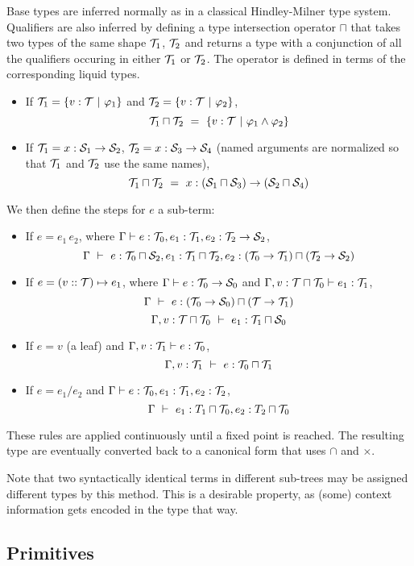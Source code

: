 Base types are inferred normally as in a classical Hindley-Milner type system.
Qualifiers are also inferred by defining a type intersection operator $\sqcap$ that
takes two types of the same shape $\mathcal{T}_1$, $\mathcal{T}_2$ and returns a type with a conjunction of all the qualifiers
occuring in either $\mathcal{T}_1$ or $\mathcal{T}_2$. The operator is defined in terms of the corresponding liquid types.
\begin{itemize}
  \item If $\mathcal{T}_1=\{v:\mathcal{T} ~|~ \varphi_1\}$ and $\mathcal{T}_2=\{v:\mathcal{T} ~|~ \varphi_2\}$,
	\[\mathcal{T}_1\sqcap\mathcal{T}_2 ~=~ \{v:\mathcal{T} ~|~ \varphi_1\land\varphi_2\}\]
  \item If $\mathcal{T}_1=x:\mathcal{S}_1\to\mathcal{S}_2$, $\mathcal{T}_2=x:\mathcal{S}_3\to\mathcal{S}_4$ (named arguments are normalized so that $\mathcal{T}_1$ and $\mathcal{T}_2$ use the same names),
    \[\mathcal{T}_1\sqcap\mathcal{T}_2 ~=~ x:(\mathcal{S}_1\sqcap\mathcal{S}_3)\to(\mathcal{S}_2\sqcap\mathcal{S}_4)\]
\end{itemize}

We then define the  steps for $e$ a sub-term:
\begin{itemize}
  \item If $e=e_1\,e_2$, where $\Gamma \vdash e:\mathcal{T}_0, e_1:\mathcal{T}_1, e_2:\mathcal{T}_2\to\mathcal{S}_2$,
    \[\Gamma ~\vdash~ e:\mathcal{T}_0\sqcap\mathcal{S}_2, e_1:\mathcal{T}_1\sqcap\mathcal{T}_2, e_2:(\mathcal{T}_0\to\mathcal{T}_1)\sqcap(\mathcal{T}_2\to\mathcal{S}_2)\]
  \item If $e=(v::\mathcal{T})\mapsto e_1$, where $\Gamma\vdash e:\mathcal{T}_0\to\mathcal{S}_0$ and $\Gamma,v:\mathcal{T}\sqcap\mathcal{T}_0\vdash e_1:\mathcal{T}_1$,
    \[\Gamma ~\vdash~ e:(\mathcal{T}_0\to\mathcal{S}_0)\sqcap(\mathcal{T}\to\mathcal{T}_1)\]
    \[\Gamma,v:\mathcal{T}\sqcap\mathcal{T}_0 ~\vdash~ e_1:\mathcal{T}_1\sqcap\mathcal{S}_0\]
  \item If $e=v$ (a leaf) and $\Gamma,v:\mathcal{T}_1\vdash e:\mathcal{T}_0$,
    \[\Gamma,v:\mathcal{T}_1 ~\vdash~ e:\mathcal{T}_0\sqcap\mathcal{T}_1\]
  \item If $e=e_1/e_2$ and $\Gamma\vdash e:\mathcal{T}_0, e_1:\mathcal{T}_1, e_2:\mathcal{T}_2$,
    \[\Gamma ~\vdash~ e_1:T_1\sqcap\mathcal{T}_0, e_2:T_2\sqcap\mathcal{T}_0\]
\end{itemize}

These rules are applied continuously until a fixed point is reached.
The resulting type are eventually converted back to a canonical form that uses $\cap$ and $\times$.

Note that two syntactically identical terms in different sub-trees may be assigned
different types by this method. This is a desirable property, as (some) context information
gets encoded in the type that way.

\subsection{Primitives}

